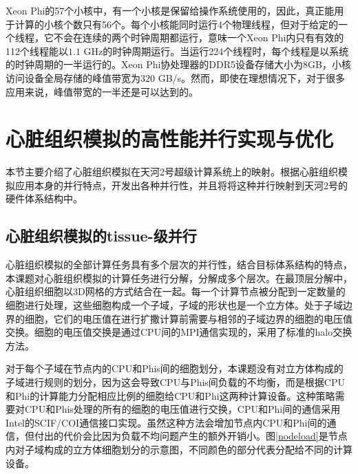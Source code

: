 Xeon Phi的57个小核中，有一个小核是保留给操作系统使用的，因此，真正能用于计算的小核个数只有56个。每个小核能同时运行4个物理线程，但对于给定的一个线程，它不会在连续的两个时钟周期都运行，意味一个Xeon Phi内只有有效的112个线程能以$1.1$ GHz的时钟周期运行。当运行224个线程时，每个线程是以系统的时钟周期的一半运行的。Xeon Phi协处理器的DDR5设备存储大小为8GB，小核访问设备全局存储的峰值带宽为$320$ GB/s。然而，即使在理想情况下，对于很多应用来说，峰值带宽的一半还是可以达到的。


\section{心脏组织模拟的高性能并行实现与优化}

本节主要介绍了心脏组织模拟在天河2号超级计算系统上的映射。根据心脏组织模拟应用本身的并行特点，开发出各种并行性，并且将将这种并行映射到天河2号的硬件体系结构中。

\subsection{心脏组织模拟的tissue-级并行}
\label{tissueParallel}
心脏组织模拟的全部计算任务具有多个层次的并行性，结合目标体系结构的特点，本课题对心脏组织模拟的计算任务进行分解，分解成多个层次。在最顶层分解中，心脏组织细胞以3D网格的方式结合在一起。每一个计算节点被分配到一定数量的细胞进行处理，这些细胞构成一个子域，子域的形状也是一个立方体。处于子域边界的细胞，它们的电压值在进行扩撒计算前需要与相邻的子域边界的细胞的电压值交换。细胞的电压值交换是通过CPU间的MPI通信实现的，采用了标准的halo交换方法。

对于每个子域在节点内的CPU和Phis间的细胞划分，本课题没有对立方体构成的子域进行规则的划分，因为这会导致CPU与Phis间负载的不均衡，而是根据CPU和Phi的计算能力分配相应比例的细胞给CPU和Phi这两种计算设备。这种策略需要对CPU和Phis处理的所有的细胞的电压值进行交换，CPU和Phi间的通信采用Intel的SCIF/COI通信接口实现。虽然这种方法会增加节点内CPU和Phi间的通信，但付出的代价会比因为负载不均问题产生的额外开销小。图\ref{nodeload}是节点内对子域构成的立方体细胞划分的示意图，不同颜色的部分代表分配给不同的计算设备。

